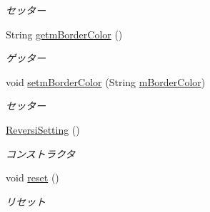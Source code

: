 \begin{DoxyCompactItemize}
\begin{DoxyCompactList}\small\item\em セッター \end{DoxyCompactList}\item 
String \hyperlink{classjp_1_1gr_1_1java__conf_1_1yuta__yoshinaga_1_1reversi_1_1model_1_1_reversi_setting_a430420179444e380ddf57e3480dc0087}{getm\+Border\+Color} ()
\begin{DoxyCompactList}\small\item\em ゲッター \end{DoxyCompactList}\item 
void \hyperlink{classjp_1_1gr_1_1java__conf_1_1yuta__yoshinaga_1_1reversi_1_1model_1_1_reversi_setting_a97fd27ecb82ec6aeb111d3439d246c00}{setm\+Border\+Color} (String \hyperlink{classjp_1_1gr_1_1java__conf_1_1yuta__yoshinaga_1_1reversi_1_1model_1_1_reversi_setting_a0e8bf6dd13e2371a2174de7c4526c0da}{m\+Border\+Color})
\begin{DoxyCompactList}\small\item\em セッター \end{DoxyCompactList}\item 
\hyperlink{classjp_1_1gr_1_1java__conf_1_1yuta__yoshinaga_1_1reversi_1_1model_1_1_reversi_setting_a0e2fd0216ad010dbbc9112297a6c29c4}{Reversi\+Setting} ()
\begin{DoxyCompactList}\small\item\em コンストラクタ \end{DoxyCompactList}\item 
void \hyperlink{classjp_1_1gr_1_1java__conf_1_1yuta__yoshinaga_1_1reversi_1_1model_1_1_reversi_setting_afef8530666d1ce3522fd53938cd00353}{reset} ()
\begin{DoxyCompactList}\small\item\em リセット \end{DoxyCompactList}\end{DoxyCompactItemize}
